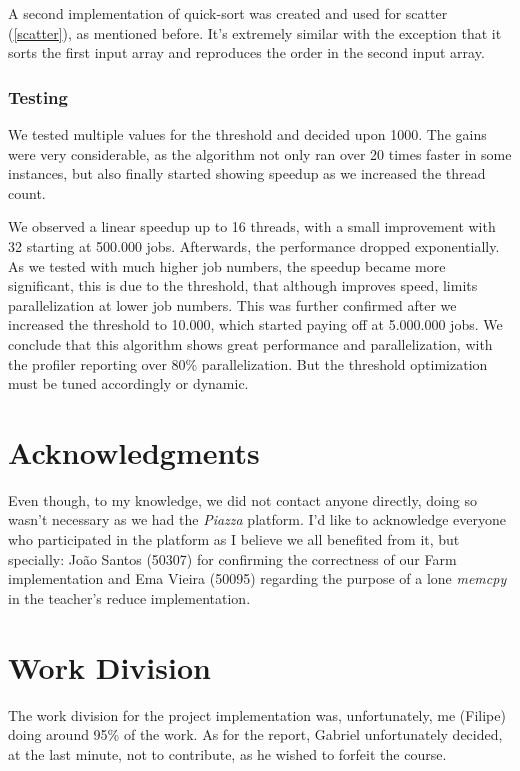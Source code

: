 \documentclass[10pt,journal]{IEEEtran}
\begin{document}
A second implementation of quick-sort was created and used for scatter (\ref{scatter}), as mentioned before. It's extremely similar with the exception that it sorts the first input array and reproduces the order in the second input array.

\subsubsection{Testing}

We tested multiple values for the threshold and decided upon 1000. The gains were very considerable, as the algorithm not only ran over 20 times faster in some instances, but also finally started showing speedup as we increased the thread count.

We observed a linear speedup up to 16 threads, with a small improvement with 32 starting at 500.000 jobs. Afterwards, the performance dropped exponentially. As we tested with much higher job numbers, the speedup became more significant, this is due to the threshold, that although improves speed, limits parallelization at lower job numbers. This was further confirmed after we increased the threshold to 10.000, which started paying off at 5.000.000 jobs. We conclude that this algorithm shows great performance and parallelization, with the profiler reporting over 80\% parallelization. But the threshold optimization must be tuned accordingly or dynamic.

\section{Acknowledgments}

Even though, to my knowledge, we did not contact anyone directly, doing so wasn't necessary as we had the \textit{Piazza} platform. I'd like to acknowledge everyone who participated in the platform as I believe we all benefited from it, but specially: João Santos (50307) for confirming the correctness of our Farm implementation and Ema Vieira (50095) regarding the purpose of a lone \textit{memcpy} in the teacher's reduce implementation.

\section{Work Division}

The work division for the project implementation was, unfortunately, me (Filipe) doing around 95\% of the work. As for the report, Gabriel unfortunately decided, at the last minute, not to contribute, as he wished to forfeit the course.


{}
\end{document}
